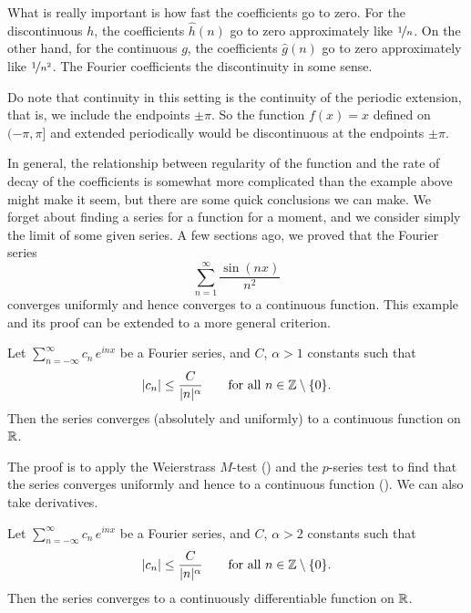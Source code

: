 \begin{example}
What is really important is how fast the coefficients go to zero.  For the
discontinuous $h$, the coefficients $\hat{h}(n)$ go to zero approximately like
$\nicefrac{1}{n}$.  On the other hand, for the continuous $g$,
the coefficients $\hat{g}(n)$ go to zero approximately like
$\nicefrac{1}{n^2}$.
The Fourier coefficients 
the discontinuity in some sense.

Do note that continuity in this setting is the continuity of the
periodic extension, that is, we include the endpoints $\pm \pi$.
So the function $f(x) = x$ defined on $(-\pi,\pi]$
and extended periodically would be discontinuous at the endpoints $\pm\pi$.
\end{example}

In general, the relationship between regularity of the function and
the rate of decay of the coefficients is somewhat more complicated
than the example above
might make it seem, but there are some quick conclusions we can make.
We forget about finding a series for a function for a moment,
and we consider simply the limit of some given series.
A few sections ago, we proved that the Fourier series 
\begin{equation*}
\sum_{n=1}^\infty \frac{\sin(nx)}{n^2}
\end{equation*}
converges uniformly and hence converges to a continuous function.  This 
example and its proof can be extended to a more general criterion.

\begin{prop}
Let $\sum_{n=-\infty}^\infty c_n\, e^{inx}$ be a Fourier series,
and $C$, $\alpha > 1$ constants such that
\begin{equation*}
\sabs{c_n} \leq \frac{C}{\sabs{n}^\alpha}
\qquad \text{for all } n \in \Z \setminus \{ 0 \}.
\avoidbreak
\end{equation*}
Then the series converges (absolutely and uniformly) to a continuous function on ${\mathbb{R}}$.
\end{prop}

The proof is to apply the Weierstrass $M$-test () and
the $p$-series test to find that the series converges uniformly and hence
to a continuous function ().
We can also take derivatives.

\begin{prop}
Let $\sum_{n=-\infty}^\infty c_n\, e^{inx}$ be a Fourier series,
and $C$, $\alpha > 2$ constants such that
\begin{equation*}
\sabs{c_n} \leq \frac{C}{\sabs{n}^\alpha}
\qquad \text{for all } n \in \Z \setminus \{ 0 \}.
\avoidbreak
\end{equation*}
Then the series converges to a continuously differentiable function on ${\mathbb{R}}$.
\end{prop}

